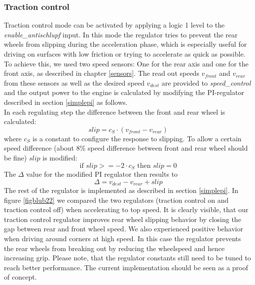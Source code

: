 \documentclass[a4paper
               ,10pt
               ,DIV=10 %
               ,BCOR=0.3cm
               ,pagesize %
               ,headings=small
               ,bibtotoc
               ]
               {scrartcl}
\begin{document}
\subsubsection{Traction control}
Traction control mode can be activated by applying a logic 1 level to the \emph{enable\_antischlupf} input. In this mode the regulator tries to prevent the rear wheels from slipping during the acceleration phase, which is especially useful for driving on surfaces with low friction or trying to accelerate as quick as possible. To achieve this, we used two speed sensors: One for the rear axis and one for the front axis, as described in chapter \ref{sensors}. The read out speeds $v_{front}$ and $v_{rear}$ from these sensors as well as the desired speed $v_{dest}$ are provided to \emph{speed\_control} and the output power to the engine is calculated by modifying the PI-regulator described in section \ref{simplepi} as follows.\\
In each regulating step the difference between the front and rear wheel is calculated:
$$slip = c_S \cdot (v_{front} - v_{rear})$$
where $c_S$ is a constant to configure the response to slipping. To allow a certain speed difference (about 8\% speed difference between front and rear wheel should be fine) $slip$ is modified:
$$\text{if }slip>=-2\cdot c_S \text{ then }  slip = 0$$
The $\Delta$ value for the modified PI regulator then results to
$$\Delta = v_{dest} - v_{rear} + slip$$
The rest of the regulator is implemented as described in section \ref{simplepi}. In figure \ref{figblub22} we compared the two regulators (traction control on and traction control off) when accelerating to top speed. It is clearly visible, that our traction control regulator improves rear wheel slipping behavior by closing the gap between rear and front wheel speed. We also experienced positive behavior when driving around corners at high speed. In this case the regulator prevents the rear wheels from breaking out by reducing the wheelspeed and hence increasing grip. Please note, that the regulator constants still need to be tuned to reach better performance. The current implementation should be seen as a proof of concept.
\end{document}

